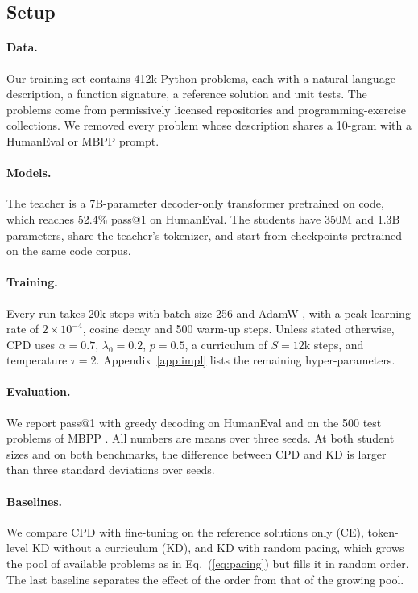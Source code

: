 \documentclass{article} %
\begin{document}
\subsection{Setup}

\paragraph{Data.}
Our training set contains 412k Python problems, each with a natural-language description, a function signature, a reference solution and unit tests.
The problems come from permissively licensed repositories and programming-exercise collections.
We removed every problem whose description shares a 10-gram with a HumanEval or MBPP prompt.

\paragraph{Models.}
The teacher is a 7B-parameter decoder-only transformer \citep{vaswani2017attention} pretrained on code, which reaches 52.4\% pass@1 on HumanEval.
The students have 350M and 1.3B parameters, share the teacher's tokenizer, and start from checkpoints pretrained on the same code corpus.

\paragraph{Training.}
Every run takes 20k steps with batch size 256 and AdamW \citep{kingma2015adam,loshchilov2019decoupled}, with a peak learning rate of $2 \times 10^{-4}$, cosine decay and 500 warm-up steps.
Unless stated otherwise, CPD uses $\alpha = 0.7$, $\lambda_0 = 0.2$, $p = 0.5$, a curriculum of $S = 12$k steps, and temperature $\tau = 2$.
Appendix~\ref{app:impl} lists the remaining hyper-parameters.

\paragraph{Evaluation.}
We report pass@1 with greedy decoding on HumanEval \citep{chen2021evaluating} and on the 500 test problems of MBPP \citep{austin2021program}.
All numbers are means over three seeds.
At both student sizes and on both benchmarks, the difference between CPD and KD is larger than three standard deviations over seeds.

\paragraph{Baselines.}
We compare CPD with fine-tuning on the reference solutions only (CE), token-level KD without a curriculum (KD), and KD with random pacing, which grows the pool of available problems as in Eq.~(\ref{eq:pacing}) but fills it in random order.
The last baseline separates the effect of the order from that of the growing pool.
\end{document}
